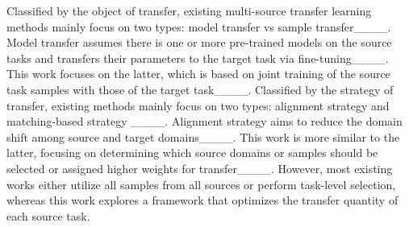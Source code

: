 Classified by the object of transfer, existing multi-source transfer learning methods mainly focus on two types: model transfer vs sample transfer____. Model transfer assumes there is one or more pre-trained models on the source tasks and transfers their parameters to the target task via fine-tuning____.  This work focuses on the latter, which is based on joint training of the source task samples with those of the target task____. %
Classified by the strategy of transfer, existing methods mainly focus on two types: alignment strategy and matching-based strategy ____. Alignment strategy aims to reduce the domain shift among source and target domains____. This work is more similar to the latter, focusing on determining which source domains or samples should be selected or assigned higher weights for transfer____. 
However, most existing works either utilize all samples from all sources or perform task-level selection, whereas this work explores a framework that optimizes the transfer quantity of each source task.






